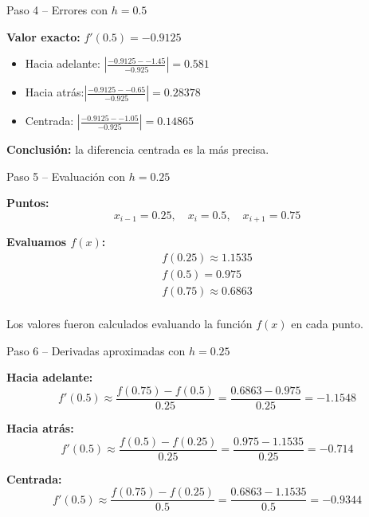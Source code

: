 \documentclass[main.tex]{subfiles}
\begin{document}
\begin{frame}{Paso 4 – Errores con \(h = 0.5\)}

\textbf{Valor exacto:} \( f'(0.5) = -0.9125 \)

\begin{itemize}
  \item Hacia adelante: \(|\frac{-0.9125- -1.45}{-0.925}| = 0.581\)
  \item Hacia atrás:\(|\frac{-0.9125- -0.65}{-0.925}| = 0.28378\)
  \item Centrada: \(|\frac{-0.9125- -1.05}{-0.925}| = 0.14865\)
\end{itemize}

\textbf{Conclusión:} la diferencia centrada es la más precisa.

\end{frame}
\begin{frame}{Paso 5 – Evaluación con \(h = 0.25\)}

\textbf{Puntos:}
\[
x_{i-1} = 0.25, \quad x_i = 0.5, \quad x_{i+1} = 0.75
\]

\textbf{Evaluamos \(f(x)\):}
\[
\begin{array}{ll}
f(0.25) \approx 1.1535 \\
f(0.5) = 0.975 \\
f(0.75) \approx 0.6863 \\
\end{array}
\]

Los valores fueron calculados evaluando la función \(f(x)\) en cada punto.

\end{frame}
\begin{frame}{Paso 6 – Derivadas aproximadas con \(h = 0.25\)}

\textbf{Hacia adelante:}
\[
f'(0.5) \approx \frac{f(0.75) - f(0.5)}{0.25}
= \frac{0.6863 - 0.975}{0.25} = -1.1548
\]

\textbf{Hacia atrás:}
\[
f'(0.5) \approx \frac{f(0.5) - f(0.25)}{0.25}
= \frac{0.975 - 1.1535}{0.25} = -0.714
\]

\textbf{Centrada:}
\[
f'(0.5) \approx \frac{f(0.75) - f(0.25)}{0.5}
= \frac{0.6863 - 1.1535}{0.5} = -0.9344
\]

\end{frame}
\end{document}
